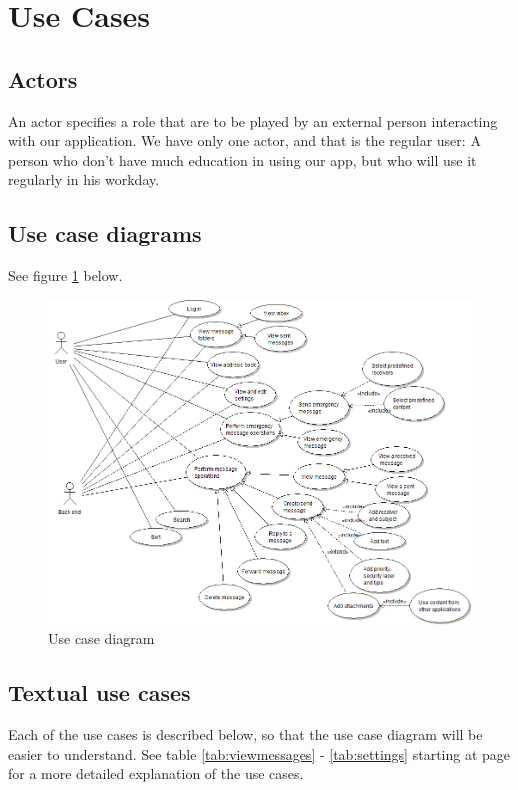 \section{Use Cases}

\subsection{Actors}
An actor specifies a role that are to be played by an external person interacting with our application. We have only one actor, and that is the regular user:  A person who don’t have much education in using our app, but who will use it regularly in his workday.

\subsection{Use case diagrams}
See figure \ref{fig:usecase} below.

\begin{figure}[h!]
\begin{center}
\includegraphics[width=\textwidth]{kpro-use-case}
\caption{Use case diagram} \label{fig:usecase}
\end{center}
\end{figure}

\subsection{Textual use cases}
Each of the use cases is described below, so that the use case diagram will be easier to understand. See table \ref{tab:viewmessages} - \ref{tab:settings} starting at page \pageref{tab:viewmessages} for a more detailed explanation of the use cases.

